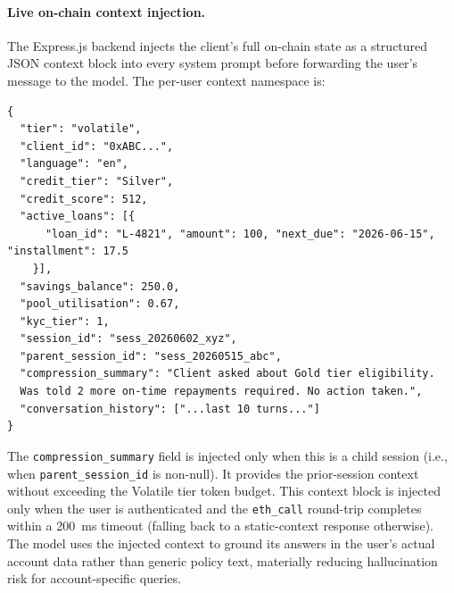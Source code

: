 \documentclass[12pt, a4paper]{report}
\begin{document}
\paragraph{Live on-chain context injection.}
The Express.js backend injects the client's full on-chain state as a structured JSON context block into every system prompt before forwarding the user's message to the model. The per-user context namespace is:
\begin{verbatim}
{
  "tier": "volatile",
  "client_id": "0xABC...",
  "language": "en",
  "credit_tier": "Silver",
  "credit_score": 512,
  "active_loans": [{
      "loan_id": "L-4821", "amount": 100, "next_due": "2026-06-15", "installment": 17.5
    }],
  "savings_balance": 250.0,
  "pool_utilisation": 0.67,
  "kyc_tier": 1,
  "session_id": "sess_20260602_xyz",
  "parent_session_id": "sess_20260515_abc",
  "compression_summary": "Client asked about Gold tier eligibility.
  Was told 2 more on-time repayments required. No action taken.",
  "conversation_history": ["...last 10 turns..."]
}
\end{verbatim}
The \texttt{compression\_summary} field is injected only when this is a child session (i.e., when \texttt{parent\_session\_id} is non-null). It provides the prior-session context without exceeding the Volatile tier token budget. This context block is injected only when the user is authenticated and the \texttt{eth\_call} round-trip completes within a 200~ms timeout (falling back to a static-context response otherwise). The model uses the injected context to ground its answers in the user's actual account data rather than generic policy text, materially reducing hallucination risk for account-specific queries.
\end{document}
